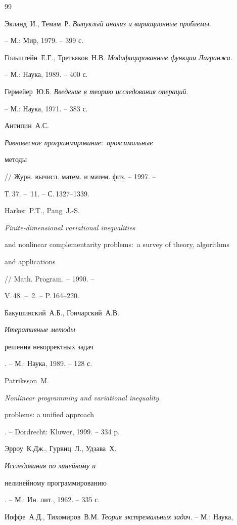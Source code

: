 \begin{thebibliography}{99}







Экланд~И., Темам~Р. {\em Выпуклый анализ и вариационные проблемы}. 


-- М.: Мир, 1979. -- 399 с.




Гольштейн~Е.Г., Третьяков~Н.В. {\em Модифицированные функции Лагранжа}.


-- М.: Наука, 1989. -- 400 с.




Гермейер~Ю.Б. {\em Введение в теорию исследования операций}.


-- М.: Наука, 1971. -- 383 с.




Антипин~А.С. {\em Равновесное программирование$:$ проксимальные 


методы} // Журн. вычисл. матем. и матем. физ. -- 1997. --


Т.\,37. -- \No\,11. -- С.\,1327--1339.




Harker~P.T., Pang~J.-S. {\em Finite-dimensional variational inequalities 


and nonlinear complementarity problems$:$ a survey of theory, algorithms 


and applications} // Math. Program. -- 1990. --


V.\,48. -- \No\,2. -- P.\,164--220.




Бакушинский~А.Б., Гончарский~А.В. {\em Итеративные методы 


решения некорректных задач}. -- М.: Наука, 1989. -- 128 с.




Patriksson~M. {\em Nonlinear programming and variational inequality 


problems: a unified approach}. -- Dordrecht: Kluwer, 1999. -- 334 p.




Эрроу~К.Дж., Гурвиц~Л., Удзава~Х. {\em Исследования по линейному и 


нелинейному программированию}. -- М.: Ин. лит., 1962. -- 335 с.




Иоффе~А.Д., Тихомиров~В.М. {\em Теория экстремальных задач}. -- М.: Наука, 



\end{thebibliography}
